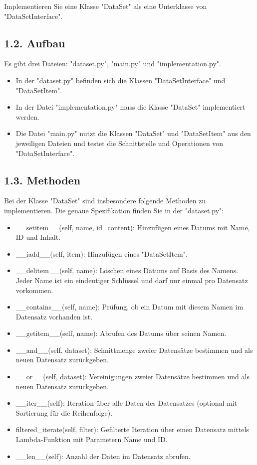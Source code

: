 \documentclass[a4paper,12pt]{article}
\begin{document}
Implementieren Sie eine Klasse "DataSet" als eine Unterklasse von "DataSetInterface".

\subsection{1.2. Aufbau}
\justify
Es gibt drei Dateien: "dataset.py", "main.py" und "implementation.py".
\begin{itemize}
    \item In der "dataset.py" befinden sich die Klassen "DataSetInterface" und "DataSetItem".
    \item In der Datei "implementation.py" muss die Klasse "DataSet" implementiert werden.
    \item Die Datei "main.py" nutzt die Klassen "DataSet" und "DataSetItem" aus den jeweiligen Dateien und testet die Schnittstelle und Operationen von "DataSetInterface".
\end{itemize}

\subsection{1.3. Methoden}
\justify
Bei der Klasse "DataSet" sind insbesondere folgende Methoden zu implementieren. Die genaue Spezifikation finden Sie in der "dataset.py":
\begin{itemize}
    \item \_\_setitem\_\_(self, name, id\_content): Hinzufügen eines Datums mit Name, ID und Inhalt.
    \item \_\_iadd\_\_(self, item): Hinzufügen eines "DataSetItem".
    \item \_\_delitem\_\_(self, name): Löschen eines Datums auf Basis des Namens. Jeder Name ist ein eindeutiger Schlüssel und darf nur einmal pro Datensatz vorkommen.
    \item \_\_contains\_\_(self, name): Prüfung, ob ein Datum mit diesem Namen im Datensatz vorhanden ist.
    \item \_\_getitem\_\_(self, name): Abrufen des Datums über seinen Namen.
    \item \_\_and\_\_(self, dataset): Schnittmenge zweier Datensätze bestimmen und als neuen Datensatz zurückgeben.
    \item \_\_or\_\_(self, dataset): Vereinigungen zweier Datensätze bestimmen und als neuen Datensatz zurückgeben.
    \item \_\_iter\_\_(self): Iteration über alle Daten des Datensatzes (optional mit Sortierung für die Reihenfolge).
    \item filtered\_iterate(self, filter): Gefilterte Iteration über einen Datensatz mittels Lambda-Funktion mit Parametern Name und ID.
    \item \_\_len\_\_(self): Anzahl der Daten im Datensatz abrufen.
\end{itemize}
\end{document}
